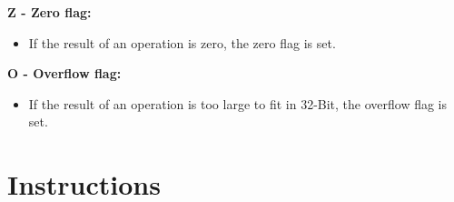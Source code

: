 \documentclass[titlepage]{scrartcl}
\begin{document}
\newcommand{\flagdesc}[3]{
	\hfill \break
	\textbf{#2 - #1 flag:}
	\begin{itemize}
		\item #3
	\end{itemize}
}

\flagdesc{Zero}{Z}{If the result of an operation is zero, the zero flag is set.}
\flagdesc{Overflow}{O}{If the result of an operation is too large to fit in 32-Bit, the overflow flag is set.}
\newpage

\section{Instructions}

\newcommand{\instruction}[9]{
	\subsection{#1 - #2}
	{
		\renewcommand{\arraystretch}{1.5}
		\begin{tabularx}{\textwidth}{XXX}
			\textbf{Description:}     &                   &                          \\
			\multicolumn{3}{>{\hsize=\dimexpr3\hsize+3\tabcolsep}X}{#3}              \\ [1ex]
			\textbf{Operation:}       &                   &                          \\
			\multicolumn{3}{>{\hsize=\dimexpr3\hsize+3\tabcolsep}X}{#4}              \\ [1ex]
			\textbf{Syntax}           & \textbf{Operands} & \textbf{Program counter} \\
			\texttt{#5}               & #6                & #7                       \\ [1ex]
			\textbf{Opcode:}          &                   &                          \\
			\multicolumn{3}{>{\hsize=\dimexpr3\hsize+3\tabcolsep}X}{#8}              \\ [1ex]
			\textbf{Status register:} &                   &                          \\
			\multicolumn{3}{>{\hsize=\dimexpr3\hsize+3\tabcolsep}X}{#9}              \\ [1ex]
		\end{tabularx}
	}
	\newpage
}

\newcommand{\opcodegen}[4]{
	\renewcommand{\arraystretch}{1.5}
	\begin{tabularx}{\textwidth}{|Y|Y|Y|Y|}
		\hline
		#1 & #2 & #3 & #4 \\
		\hline
	\end{tabularx}
}
\end{document}
